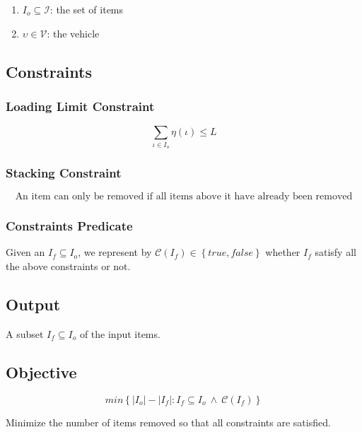 \documentclass{article}
\newcommand{\true}{\ensuremath{true}\xspace}
\newcommand{\false}{\ensuremath{false}\xspace}
\newcommand{\abs}[1]{\ensuremath{\left| #1 \right|}\xspace}
\newcommand{\Set}[1]{\ensuremath{\left\{#1\right\}}}
\newcommand{\SetOf}[2]{\ensuremath{\left\{ #1 : #2 \right\}}\xspace}
\newcommand{\vehicleO}{\ensuremath{\upsilon}\xspace}
\newcommand{\vehicleSet}{\mathcal{V}\xspace}
\newcommand{\loadingFunction}{\ensuremath{\eta}\xspace}
\newcommand{\loadingFunctionApply}[1]{\loadingFunction \left( #1 \right)\xspace}
\newcommand{\loadingLimit}{\ensuremath{L}\xspace}
\newcommand{\itemO}{\ensuremath{\iota}\xspace}
\newcommand{\itemSet}{\ensuremath{\mathcal{I}}\xspace}
\newcommand{\itemInput}{\ensuremath{\mathit{I}_{o}}\xspace}
\newcommand{\itemOutput}{\ensuremath{\mathit{I}_{f}}\xspace}
\newcommand{\vehicleInput}{\vehicleO}
\newcommand{\constraintsPredicateSymbol}{\ensuremath{\mathscr{C}}\xspace}
\newcommand{\constraintsPredicate}[1]{\ensuremath{\constraintsPredicateSymbol \left( #1 \right)}\xspace}
\begin{document}
\begin{enumerate}
	\item $\itemInput \subseteq \itemSet$: the set of items
	\item $\vehicleInput \in \vehicleSet$: the vehicle
\end{enumerate}

\subsection{Constraints}

\subsubsection*{Loading Limit Constraint}
	\label{constraint:loading-limit}
\begin{equation}
	\displaystyle\sum\limits_{\itemO \in \itemInput}
		\loadingFunctionApply{\itemO}
		\leq \loadingLimit
\end{equation}

\subsubsection*{Stacking Constraint}
	\label{constraint:stacking}
\begin{equation}
	\mbox{An item can only be removed if all items above it have already been removed}
\end{equation}

\subsubsection*{Constraints Predicate}

Given an $\itemOutput \subseteq \itemInput$, we represent by $\constraintsPredicate{\itemOutput} \in \Set{\true, \false}$ whether \itemOutput satisfy all the above constraints or not.

\subsection{Output}

A subset $\itemOutput \subseteq \itemInput$ of the input items.

\subsection{Objective}

\begin{equation}
	min\SetOf{\abs{\itemInput} - \abs{\itemOutput}}{\itemOutput \subseteq \itemInput \ \land \ \constraintsPredicate{\itemOutput}}
\end{equation}

Minimize the number of items removed so that all constraints are satisfied.



\end{document}
